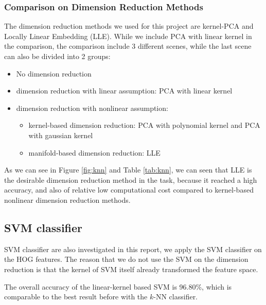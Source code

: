 \documentclass[12pt]{article}
\begin{document}
\subsubsection{Comparison on Dimension Reduction Methods}
The dimension reduction methods we used for this project are kernel-PCA and Locally Linear Embedding (LLE). While we include PCA with linear kernel in the comparison, the comparison include 3 different scenes, while the last scene can also be divided into 2 groups:
\begin{itemize}
	\item No dimension reduction
	\item dimension reduction with linear assumption: PCA with linear kernel
	\item dimension reduction with nonlinear assumption:
	\begin{itemize}
		\item kernel-based dimension reduction: PCA with polynomial kernel and PCA with gaussian kernel
		\item manifold-based dimension reduction: LLE
	\end{itemize}
\end{itemize}

As we can see in Figure \ref{fig:knn} and Table \ref{tab:knn}, we can seen that LLE is the desirable dimension reduction method in the task, because it reached a high accuracy, and also of relative low computational cost compared to kernel-based nonlinear dimension reduction methods.

\subsection{SVM classifier}

SVM classifier are also investigated in this report, we apply the SVM classifier on the HOG features. The reason that we do not use the SVM on the dimension reduction is that the kernel of SVM itself already transformed the feature space.

The overall accuracy of the linear-kernel based SVM is 96.80\%, which is comparable to the best result before with the $k$-NN classifier.
\end{document}
